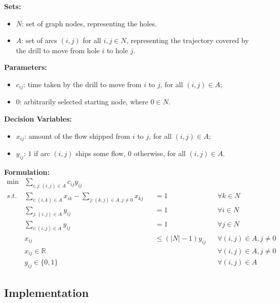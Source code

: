 \documentclass[../main.tex]{subfiles}
\begin{document}
\textbf{Sets:}
\begin{itemize}
\item $ N $: set of graph nodes, representing the holes.  
\item $ A $: set of arcs $ (i, j) $ for all $ i, j \in N $, representing the trajectory covered by the drill to move from hole $ i $ to hole $ j $.
\end{itemize}

\textbf{Parameters:}
\begin{itemize}
    \item $ c_{ij} $: time taken by the drill to move from $ i $ to $ j $, for all $ (i, j) \in A $;
    \item $ 0 $: arbitrarily selected starting node, where $ 0 \in N $.
\end{itemize}

\textbf{Decision Variables:}
\begin{itemize}
    \item $ x_{ij} $: amount of the flow shipped from $ i $ to $ j $, for all $ (i, j) \in A $;
    \item $ y_{ij} $: $ 1 $ if arc $ (i, j) $ ships some flow, $ 0 $ otherwise, for all $ (i, j) \in A $.
\end{itemize}
\textbf{Formulation:}
\begin{align}
    \min & \sum_{i,j : (i,j) \in A} c_{i j} y_{i j}                                                                                                 \\
    \label{MILP:consume}
    s.t. & \sum_{i : (i,k) \in A} x_{i k} - \sum_{j : (k,j) \in A, j \neq 0} x_{k j} &  & = 1                    &  & \forall k \in N               \\
    \label{MILP:output}
         & \sum_{j : (i,j) \in A} y_{i j} &  & = 1   &  & \forall i \in N               \\
    \label{MILP:input}
         & \sum_{i : (i,j) \in A} y_{i j}  &  & = 1 &  & \forall j \in N               \\
    \label{MILP:activation}
         & x_{i j} &  & \leq (|N| - 1) y_{i j} &  & \forall (i,j) \in A, j \neq 0 \\
         & x_{i j} \in \mathbb{R} &  & &  & \forall (i,j) \in A, j \neq 0 \\
         & y_{i j} \in \{0, 1\} &  &  &  & \forall (i,j) \in A
\end{align}

\subsection{Implementation}
\end{document}
